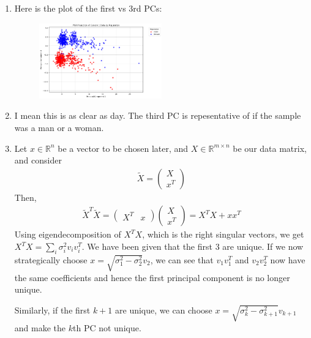 \documentclass[12pt]{article}
\theoremstyle{definitionstyle}
\def\mbb#1{\mathbb{#1}}
\def \R{\mbb{R}}
\begin{document}
\begin{enumerate}[leftmargin=\labelsep]
\begin{enumerate}[label=(\alph*)]
            \item Here is the plot of the first vs 3rd PCs:
            \begin{figure}[H]
                \centering
                \includegraphics[width=0.5\textwidth]{1_3_pcs.png}
            \end{figure}

            \item I mean this is as clear as day. The third PC is repesentative of if the sample was a man or a woman.

            \item Let $x \in \R^n$ be a vector to be chosen later, and $X \in \R^{m \times n}$ be our data matrix, and consider
            \begin{align*}
                \tilde{X} = \begin{pmatrix}
                    X \\ x^T
                \end{pmatrix}
            \end{align*}
            Then,
            \begin{align*}
                \tilde{X}^T \tilde{X} = \begin{pmatrix}
                    X^T & x
                \end{pmatrix}\begin{pmatrix}
                    X \\ x^T
                \end{pmatrix} = X^TX + xx^T
            \end{align*}
            Using eigendecomposition of $X^TX$, which is the right singular vectors, we get $X^TX = \sum_i \sigma_i^2 v_iv_i^T$. We have been given that the first 3 are unique. If we now strategically choose $x = \sqrt{\sigma_1^2 - \sigma_2^2} v_2$, we can see that $v_1v_1^T$ and $v_2v_2^T$ now have the same coefficients and hence the first principal component is no longer unique.

            Similarly, if the first $k+1$ are unique, we can choose $x = \sqrt{\sigma_k^2 - \sigma_{k+1}^2}v_{k+1}$ and make the $k$th PC not unique.
        \end{enumerate}
    \end{enumerate}
\end{document}
